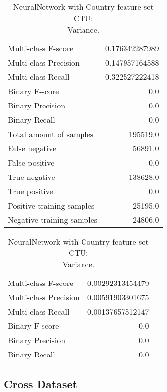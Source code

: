 \begin{table}[H]
\begin{minipage}{0.5\textwidth}
\caption{NeuralNetwork with Country feature set CTU: \\Average.}
\centering
\begin{tabular}{l r}
\toprule
Multi-class F-score & 0.176342287989 \\
Multi-class Precision & 0.147957164588 \\
Multi-class Recall & 0.322527222418 \\
\midrule
Binary F-score & 0.0 \\
Binary Precision & 0.0 \\
Binary Recall & 0.0 \\
\midrule
Total amount of samples & 195519.0 \\
False negative & 56891.0 \\
False positive & 0.0 \\
True negative & 138628.0 \\
True positive & 0.0 \\
\midrule
Positive training samples & 25195.0 \\
Negative training samples & 24806.0 \\
\bottomrule
\end{tabular}
\end{minipage}
\hfillx
\begin{minipage}{0.5\textwidth}
\caption{NeuralNetwork with Country feature set CTU: \\Variance.}
\centering
\begin{tabular}{l r}
\toprule
Multi-class F-score & 0.00292313454479 \\
Multi-class Precision & 0.00591903301675 \\
Multi-class Recall & 0.00137657512147 \\
\midrule
Binary F-score & 0.0 \\
Binary Precision & 0.0 \\
Binary Recall & 0.0 \\
\bottomrule
\end{tabular}
\end{minipage}
\end{table}

\newpage
\subsection{Cross Dataset}

